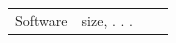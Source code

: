 \begin{table}[!t]
{{\begin{tabular}{l|lll}
Software                                                             & size, . . .                                                                                                                                                              &                                                                                                                                                              &                                                                                                                                                                                                                                                       
\end{tabular}%

}}
\end{table}
